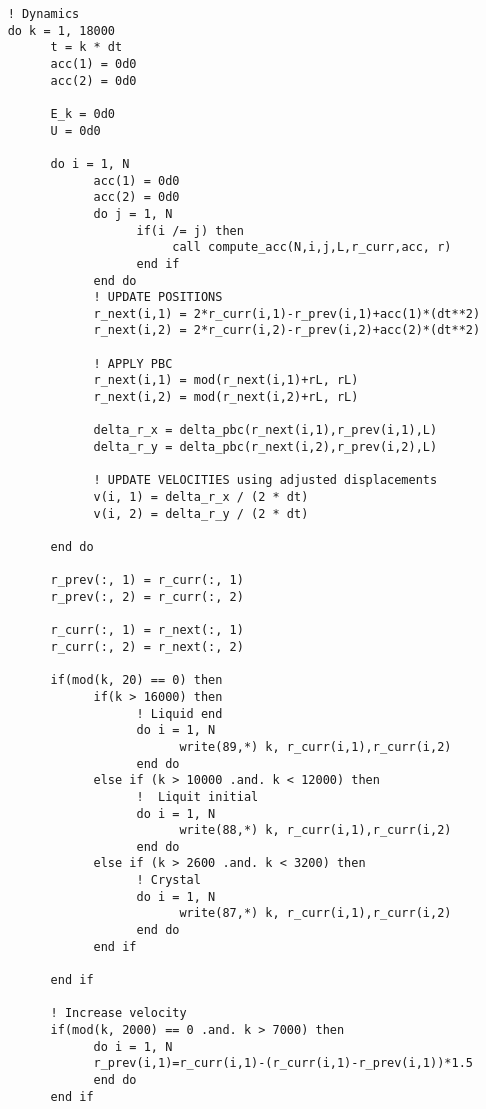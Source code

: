 \begin{verbatim}
    ! Dynamics 
    do k = 1, 18000 
          t = k * dt 
          acc(1) = 0d0 
          acc(2) = 0d0

          E_k = 0d0
          U = 0d0

          do i = 1, N 
                acc(1) = 0d0 
                acc(2) = 0d0
                do j = 1, N 
                      if(i /= j) then
                           call compute_acc(N,i,j,L,r_curr,acc, r)
                      end if
                end do 
                ! UPDATE POSITIONS
                r_next(i,1) = 2*r_curr(i,1)-r_prev(i,1)+acc(1)*(dt**2)
                r_next(i,2) = 2*r_curr(i,2)-r_prev(i,2)+acc(2)*(dt**2) 

                ! APPLY PBC
                r_next(i,1) = mod(r_next(i,1)+rL, rL)
                r_next(i,2) = mod(r_next(i,2)+rL, rL)

                delta_r_x = delta_pbc(r_next(i,1),r_prev(i,1),L)
                delta_r_y = delta_pbc(r_next(i,2),r_prev(i,2),L)

                ! UPDATE VELOCITIES using adjusted displacements
                v(i, 1) = delta_r_x / (2 * dt)
                v(i, 2) = delta_r_y / (2 * dt)

          end do

          r_prev(:, 1) = r_curr(:, 1)
          r_prev(:, 2) = r_curr(:, 2)
          
          r_curr(:, 1) = r_next(:, 1)
          r_curr(:, 2) = r_next(:, 2)

          if(mod(k, 20) == 0) then 
                if(k > 16000) then
                      ! Liquid end 
                      do i = 1, N
                            write(89,*) k, r_curr(i,1),r_curr(i,2)
                      end do
                else if (k > 10000 .and. k < 12000) then
                      !  Liquit initial
                      do i = 1, N 
                            write(88,*) k, r_curr(i,1),r_curr(i,2)
                      end do
                else if (k > 2600 .and. k < 3200) then 
                      ! Crystal
                      do i = 1, N 
                            write(87,*) k, r_curr(i,1),r_curr(i,2)
                      end do
                end if 

          end if

          ! Increase velocity
          if(mod(k, 2000) == 0 .and. k > 7000) then
                do i = 1, N
                r_prev(i,1)=r_curr(i,1)-(r_curr(i,1)-r_prev(i,1))*1.5
                end do
          end if


\end{verbatim}
